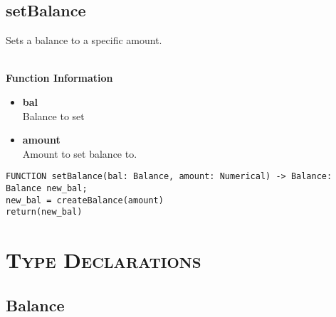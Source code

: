 \clearpage

\subsection{setBalance}
Sets a balance to a specific amount.

\textbf{ \\ Function Information}
\begin{itemize}
	\setlength{\itemsep}{0pt}
	\setlength{\parskip}{0pt}
	\setlength{\parsep}{0pt}
	\item \textbf{bal} \\ Balance to set
	\item \textbf{amount} \\ Amount to set balance to.
\end{itemize}

\begin{verbatim}
FUNCTION setBalance(bal: Balance, amount: Numerical) -> Balance:
Balance new_bal;
new_bal = createBalance(amount)
return(new_bal)
\end{verbatim}


\section{\textsc{Type Declarations}}

\subsection{Balance}
